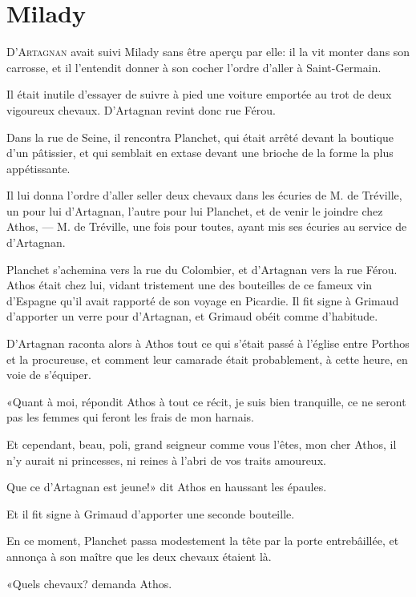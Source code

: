 
\chapter{Milady} 
	
\lettrine{D}{'Artagnan} avait suivi Milady sans être aperçu par elle: il la vit monter dans son carrosse, et il l'entendit donner à son cocher l'ordre d'aller à Saint-Germain. 

\zz
Il était inutile d'essayer de suivre à pied une voiture emportée au trot de deux vigoureux chevaux. D'Artagnan revint donc rue Férou. 

Dans la rue de Seine, il rencontra Planchet, qui était arrêté devant la boutique d'un pâtissier, et qui semblait en extase devant une brioche de la forme la plus appétissante. 

Il lui donna l'ordre d'aller seller deux chevaux dans les écuries de M. de Tréville, un pour lui d'Artagnan, l'autre pour lui Planchet, et de venir le joindre chez Athos, --- M. de Tréville, une fois pour toutes, ayant mis ses écuries au service de d'Artagnan. 

Planchet s'achemina vers la rue du Colombier, et d'Artagnan vers la rue Férou. Athos était chez lui, vidant tristement une des bouteilles de ce fameux vin d'Espagne qu'il avait rapporté de son voyage en Picardie. Il fit signe à Grimaud d'apporter un verre pour d'Artagnan, et Grimaud obéit comme d'habitude. 

D'Artagnan raconta alors à Athos tout ce qui s'était passé à l'église entre Porthos et la procureuse, et comment leur camarade était probablement, à cette heure, en voie de s'équiper. 

«Quant à moi, répondit Athos à tout ce récit, je suis bien tranquille, ce ne seront pas les femmes qui feront les frais de mon harnais. 

\speak  Et cependant, beau, poli, grand seigneur comme vous l'êtes, mon cher Athos, il n'y aurait ni princesses, ni reines à l'abri de vos traits amoureux. 

\speak  Que ce d'Artagnan est jeune!» dit Athos en haussant les épaules. 

Et il fit signe à Grimaud d'apporter une seconde bouteille. 

En ce moment, Planchet passa modestement la tête par la porte entrebâillée, et annonça à son maître que les deux chevaux étaient là. 

«Quels chevaux? demanda Athos. 

